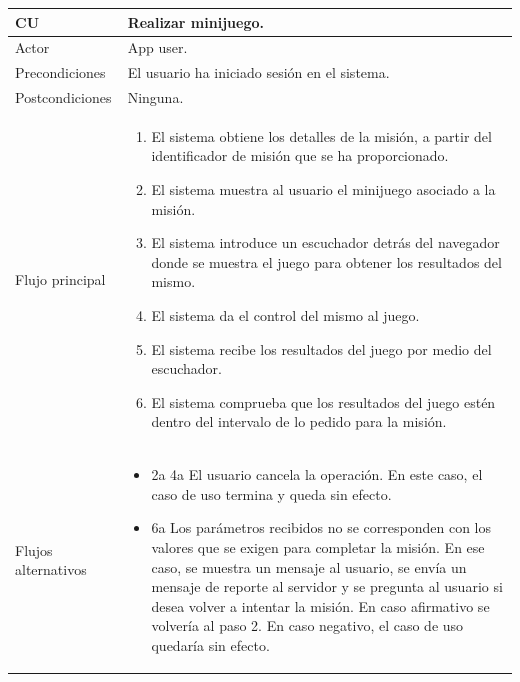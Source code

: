 \documentclass[twoside]{report}
\newcommand\addrow[2]{#1 &#2\\ }
\newcommand\addheading[2]{#1 &#2\\ \hline}
\newcommand\tabularhead{\begin{tabular}{lp{0.7\textwidth}}
\hline
}
\newenvironment{usecase}{\tabularhead}
{\hline\end{tabular}}
\begin{document}
\begin{usecase}
  \addheading{\textbf{CU\arabic{usecase}}}{Realizar minijuego.} 
  \addrow{Actor}{App user.}
  \addrow{Precondiciones}{El usuario ha iniciado sesión en el sistema.}
  \addrow{Postcondiciones}{Ninguna.}
  \addrow{Flujo principal}{
  		\begin{enumerate}
  		\item El sistema obtiene los detalles de la misión, a partir del identificador de misión que se ha proporcionado. %
  		\item El sistema muestra al usuario el minijuego asociado a la misión. %
  		\item El sistema introduce un escuchador detrás del navegador donde se muestra el juego para obtener los resultados del mismo. %
  		\item El sistema da el control del mismo al juego. %
  		\item El sistema recibe los resultados del juego por medio del escuchador. %
  		\item El sistema comprueba que los resultados del juego estén dentro del intervalo de lo pedido para la misión. %
  		\end{enumerate}
  }
  \addrow{Flujos alternativos}{
  		\begin{itemize}
  		\item 2a 4a El usuario cancela la operación. En este caso, el caso de uso termina y queda sin efecto.
  		\item 6a Los parámetros recibidos no se corresponden con los valores que se exigen para completar la misión. En ese caso, se muestra un mensaje al usuario, se envía un mensaje de reporte al servidor y se pregunta al usuario si desea volver a intentar la misión. En caso afirmativo se volvería al paso 2. En caso negativo, el caso de uso quedaría sin efecto.
  		\end{itemize}
  }
\end{usecase}\\

\vspace{0.5cm}
\end{document}
